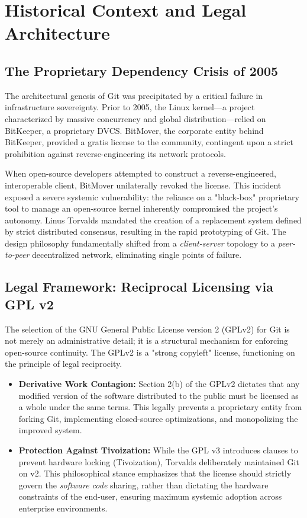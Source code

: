 \section{Historical Context and Legal Architecture}

\subsection{The Proprietary Dependency Crisis of 2005}
The architectural genesis of Git was precipitated by a critical failure in infrastructure sovereignty. Prior to 2005, the Linux kernel—a project characterized by massive concurrency and global distribution—relied on BitKeeper, a proprietary DVCS. BitMover, the corporate entity behind BitKeeper, provided a gratis license to the community, contingent upon a strict prohibition against reverse-engineering its network protocols.

When open-source developers attempted to construct a reverse-engineered, interoperable client, BitMover unilaterally revoked the license. This incident exposed a severe systemic vulnerability: the reliance on a "black-box" proprietary tool to manage an open-source kernel inherently compromised the project's autonomy. Linus Torvalds mandated the creation of a replacement system defined by strict distributed consensus, resulting in the rapid prototyping of Git. The design philosophy fundamentally shifted from a \textit{client-server} topology to a \textit{peer-to-peer} decentralized network, eliminating single points of failure.

\subsection{Legal Framework: Reciprocal Licensing via GPL v2}
The selection of the GNU General Public License version 2 (GPLv2) for Git is not merely an administrative detail; it is a structural mechanism for enforcing open-source continuity. The GPLv2 is a "strong copyleft" license, functioning on the principle of legal reciprocity.

\begin{itemize}
    \item \textbf{Derivative Work Contagion:} Section 2(b) of the GPLv2 dictates that any modified version of the software distributed to the public must be licensed as a whole under the same terms. This legally prevents a proprietary entity from forking Git, implementing closed-source optimizations, and monopolizing the improved system.
    \item \textbf{Protection Against Tivoization:} While the GPL v3 introduces clauses to prevent hardware locking (Tivoization), Torvalds deliberately maintained Git on v2. This philosophical stance emphasizes that the license should strictly govern the \textit{software code} sharing, rather than dictating the hardware constraints of the end-user, ensuring maximum systemic adoption across enterprise environments.
\end{itemize}

